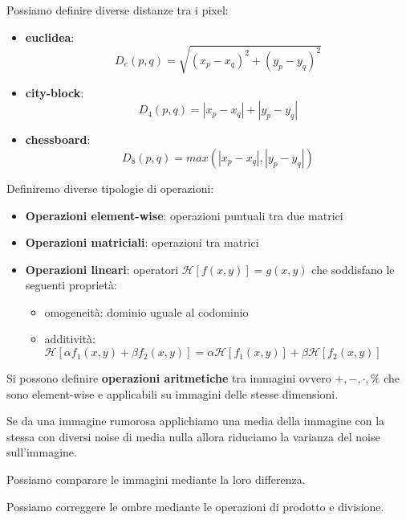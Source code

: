 Possiamo definire diverse distanze tra i pixel:
\begin{itemize}
    \item \textbf{euclidea}:
          \begin{equation}
              D_e(p,q) = \sqrt{(x_p-x_q)^2+(y_p-y_q)^2}
          \end{equation}
    \item \textbf{city-block}:
          \begin{equation}
              D_4(p,q) = |x_p-x_q|+|y_p-y_q|
          \end{equation}
    \item \textbf{chessboard}:
          \begin{equation}
              D_8(p,q) = max(|x_p-x_q|,|y_p-y_q|)
          \end{equation}
\end{itemize}

Definiremo diverse tipologie di operazioni:
\begin{itemize}
    \item \textbf{Operazioni element-wise}: operazioni puntuali tra due matrici
    \item \textbf{Operazioni matriciali}: operazioni tra matrici
    \item \textbf{Operazioni lineari}: operatori $\mathcal{H}[f(x,y)] = g(x,y)$
          che soddisfano le seguenti proprietà:
          \begin{itemize}
              \item omogeneità: dominio uguale al codominio
              \item additività: $\mathcal{H}[\alpha f_1(x,y) + \beta f_2(x,y)] =\alpha  \mathcal{H}[f_1(x,y)] + \beta  \mathcal{H}[f_2(x,y)] $
          \end{itemize}
\end{itemize}

Si possono definire \textbf{operazioni aritmetiche} tra immagini ovvero $+, -, \cdot, \%$
che sono element-wise e applicabili su immagini delle stesse dimensioni.

\begin{nota}
    Se da una immagine rumorosa applichiamo una media della immagine con la stessa con
    diversi noise di media nulla allora riduciamo la varianza del noise sull'immagine.
\end{nota}
\begin{nota}
    Possiamo comparare le immagini mediante la loro differenza.
\end{nota}
\begin{nota}
    Possiamo correggere le ombre mediante le operazioni di prodotto e divisione.
\end{nota}

